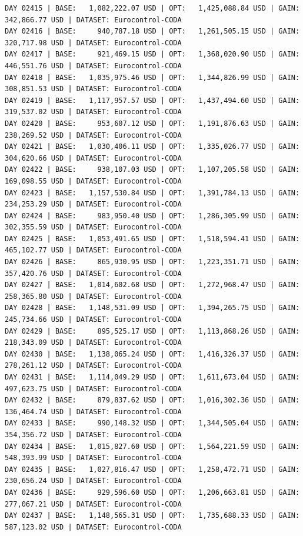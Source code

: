 \documentclass[11pt,a4paper]{article}
\begin{document}
\begin{verbatim}
DAY 02415 | BASE:   1,082,222.07 USD | OPT:   1,425,088.84 USD | GAIN: 342,866.77 USD | DATASET: Eurocontrol-CODA
DAY 02416 | BASE:     940,787.18 USD | OPT:   1,261,505.15 USD | GAIN: 320,717.98 USD | DATASET: Eurocontrol-CODA
DAY 02417 | BASE:     921,469.15 USD | OPT:   1,368,020.90 USD | GAIN: 446,551.76 USD | DATASET: Eurocontrol-CODA
DAY 02418 | BASE:   1,035,975.46 USD | OPT:   1,344,826.99 USD | GAIN: 308,851.53 USD | DATASET: Eurocontrol-CODA
DAY 02419 | BASE:   1,117,957.57 USD | OPT:   1,437,494.60 USD | GAIN: 319,537.02 USD | DATASET: Eurocontrol-CODA
DAY 02420 | BASE:     953,607.12 USD | OPT:   1,191,876.63 USD | GAIN: 238,269.52 USD | DATASET: Eurocontrol-CODA
DAY 02421 | BASE:   1,030,406.11 USD | OPT:   1,335,026.77 USD | GAIN: 304,620.66 USD | DATASET: Eurocontrol-CODA
DAY 02422 | BASE:     938,107.03 USD | OPT:   1,107,205.58 USD | GAIN: 169,098.55 USD | DATASET: Eurocontrol-CODA
DAY 02423 | BASE:   1,157,530.84 USD | OPT:   1,391,784.13 USD | GAIN: 234,253.29 USD | DATASET: Eurocontrol-CODA
DAY 02424 | BASE:     983,950.40 USD | OPT:   1,286,305.99 USD | GAIN: 302,355.59 USD | DATASET: Eurocontrol-CODA
DAY 02425 | BASE:   1,053,491.65 USD | OPT:   1,518,594.41 USD | GAIN: 465,102.77 USD | DATASET: Eurocontrol-CODA
DAY 02426 | BASE:     865,930.95 USD | OPT:   1,223,351.71 USD | GAIN: 357,420.76 USD | DATASET: Eurocontrol-CODA
DAY 02427 | BASE:   1,014,602.68 USD | OPT:   1,272,968.47 USD | GAIN: 258,365.80 USD | DATASET: Eurocontrol-CODA
DAY 02428 | BASE:   1,148,531.09 USD | OPT:   1,394,265.75 USD | GAIN: 245,734.66 USD | DATASET: Eurocontrol-CODA
DAY 02429 | BASE:     895,525.17 USD | OPT:   1,113,868.26 USD | GAIN: 218,343.09 USD | DATASET: Eurocontrol-CODA
DAY 02430 | BASE:   1,138,065.24 USD | OPT:   1,416,326.37 USD | GAIN: 278,261.12 USD | DATASET: Eurocontrol-CODA
DAY 02431 | BASE:   1,114,049.29 USD | OPT:   1,611,673.04 USD | GAIN: 497,623.75 USD | DATASET: Eurocontrol-CODA
DAY 02432 | BASE:     879,837.62 USD | OPT:   1,016,302.36 USD | GAIN: 136,464.74 USD | DATASET: Eurocontrol-CODA
DAY 02433 | BASE:     990,148.32 USD | OPT:   1,344,505.04 USD | GAIN: 354,356.72 USD | DATASET: Eurocontrol-CODA
DAY 02434 | BASE:   1,015,827.60 USD | OPT:   1,564,221.59 USD | GAIN: 548,393.99 USD | DATASET: Eurocontrol-CODA
DAY 02435 | BASE:   1,027,816.47 USD | OPT:   1,258,472.71 USD | GAIN: 230,656.24 USD | DATASET: Eurocontrol-CODA
DAY 02436 | BASE:     929,596.60 USD | OPT:   1,206,663.81 USD | GAIN: 277,067.21 USD | DATASET: Eurocontrol-CODA
DAY 02437 | BASE:   1,148,565.31 USD | OPT:   1,735,688.33 USD | GAIN: 587,123.02 USD | DATASET: Eurocontrol-CODA

\end{verbatim}
\end{document}
